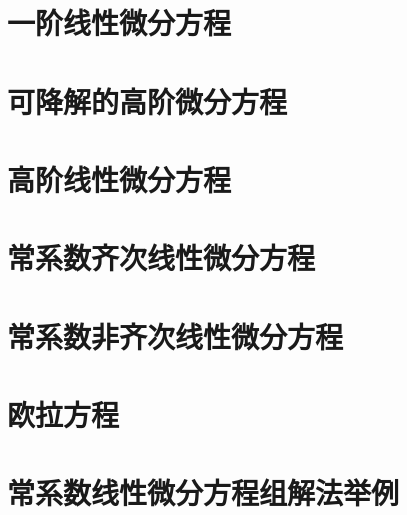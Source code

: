 \documentclass{article}
\begin{document}
  \section{一阶线性微分方程}
    
  \section{可降解的高阶微分方程}
    
  \section{高阶线性微分方程}
    
  \section{常系数齐次线性微分方程}
    
  \section{常系数非齐次线性微分方程}
    
  \section{欧拉方程}
    
  \section{常系数线性微分方程组解法举例}
    
\end{document}
